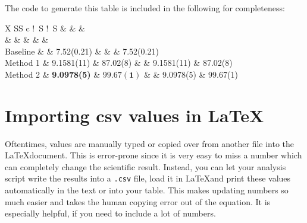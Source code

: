\documentclass{article}
\begin{document}
The code to generate this table is included in the following for completeness:
\begin{latexcode}
    \usepackage{amssymb, amsmath}
    \usepackage{tabularx}
    \usepackage{booktabs} %
    \usepackage{siunitx} %
    \usepackage{xcolor} %

    \begin{table}[ht]
    \caption{Bold text vs. cell coloring.}
    \label{table:bold_vs_cell_color}
    \centering
    \begin{tabularx}{\linewidth}{
        X
        SS
        c
        !{\color{white}\ }S %
        !{\color{white}\ }S
    }
        \toprule
        & 
             &
            & 
             \\

        &  & 
             & 
            & 
             & 
             \\
        \midrule
        Baseline &
            \textemdash &
            7.52(0.21) &
            &
            \textemdash &
            7.52(0.21) \\ \addlinespace[.25em]
        Method 1 & 
            9.1581(11) & 
            87.02(8) & 
            &
            9.1581(11) & 
            87.02(8) \\ \addlinespace[.25em]
        Method 2 & 
            \textbf{9.0978(5)} & %
            $\mathbf{99.67(1)}$ & %
            & 
             9.0978(5) & 
             99.67(1) \\
        \bottomrule
    \end{tabularx}
\end{table}
\end{latexcode}


\section{Importing csv values in \LaTeX}
Oftentimes, values are manually typed or copied over from another file into the \LaTeX document.
This is error-prone since it is very easy to miss a number which can completely change the scientific result.
Instead, you can let your analysis script write the results into a \verb|.csv| file, load it in \LaTeX and print these values automatically in the text or into your table.
This makes updating numbers so much easier and takes the human copying error out of the equation.
It is especially helpful, if you need to include a lot of numbers.
\end{document}
